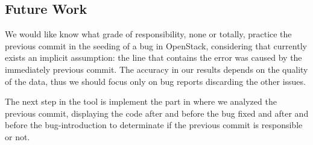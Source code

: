 \documentclass[ifip]{svmult}
\begin{document}
\subsection{Future Work}
\label{sec:5.1}

We would like know what grade of responsibility, none or totally, practice the previous commit in the seeding of a bug in OpenStack, considering that currently exists an implicit assumption: the line that contains the error was caused by the immediately previous commit\cite{Sliwerski}. The accuracy in our results depends on the quality of the data, thus we should focus only on bug reports discarding the other issues.

The next step in the tool is implement the part in where we analyzed the previous commit, displaying the code after and before the bug fixed and after and before the bug-introduction to determinate if the previous commit is responsible or not.





\end{document}
